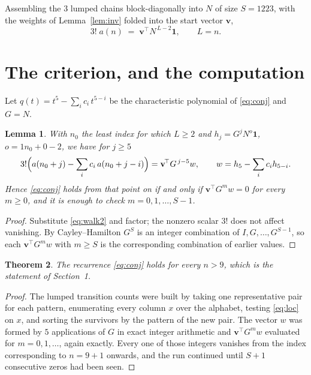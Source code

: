 \documentclass[11pt,a4paper]{article}
\theoremstyle{plain}
\newtheorem{theorem}{Theorem}
\newtheorem{lemma}[theorem]{Lemma}
\theoremstyle{definition}
\begin{document}
Assembling the $3$ lumped chains block-diagonally into $N$ of size $S=1223$, with the
weights of Lemma~\ref{lem:inv} folded into the start vector $\mathbf{v}$,
\begin{equation}\label{eq:walk2}
3!\;a(n)\;=\;\mathbf{v}^{\!\top}N^{\,L-2}\mathbf{1},\qquad L=n .
\end{equation}

\section{The criterion, and the computation}

Let $q(t)=t^{5}-\sum_i c_i\,t^{5-i}$ be the characteristic polynomial of
\eqref{eq:conj} and $G=N$.

\begin{lemma}\label{lem:crit}
With $n_0$ the least index for which $L\ge2$ and $h_j=G^{j}N^{o}\mathbf{1}$,
$o=1n_0+0-2$, we have for $j\ge5$
\[
3!\Bigl(a(n_0+j)-\sum_i c_i\,a(n_0+j-i)\Bigr)
=\mathbf{v}^{\!\top}G^{\,j-5}w,\qquad
w=h_{5}-\sum_i c_i h_{5-i} .
\]
Hence \eqref{eq:conj} holds from that point on if and only if
$\mathbf{v}^{\!\top}G^{m}w=0$ for every $m\ge0$, and it is enough to check
$m=0,1,\dots,S-1$.
\end{lemma}

\begin{proof}
Substitute \eqref{eq:walk2} and factor; the nonzero scalar $3!$ does not affect
vanishing. By Cayley--Hamilton $G^{S}$ is an integer combination of $I,G,\dots,G^{S-1}$,
so each $\mathbf{v}^{\!\top}G^{m}w$ with $m\ge S$ is the corresponding combination of
earlier values.
\end{proof}

\begin{theorem}
The recurrence \eqref{eq:conj} holds for every $n>9$, which is the statement of
Section~1.
\end{theorem}

\begin{proof}
The lumped transition counts were built by taking one representative pair for each pattern,
enumerating every column $x$ over the alphabet, testing \eqref{eq:loc} on $x$, and sorting
the survivors by the pattern of the new pair. The vector $w$ was formed by $5$
applications of $G$ in exact integer arithmetic and $\mathbf{v}^{\!\top}G^{m}w$
evaluated for $m=0,1,\dots$, again exactly. Every one of those integers vanishes from the
index corresponding to $n=9+1$ onwards, and the run continued until $S+1$ consecutive
zeros had been seen.
\end{proof}
\end{document}
